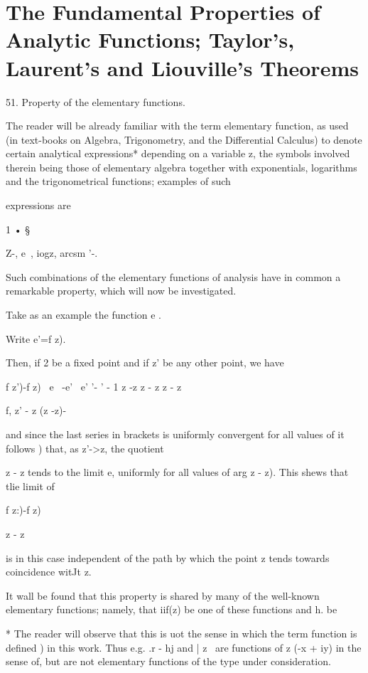 \chapter{The Fundamental Properties of Analytic Functions; 
Taylor's, Laurent's and Liouville's Theorems} 

51. Property of the elementary functions.

The reader will be already familiar with the term elementary function,
as used (in text-books on Algebra, Trigonometry, and the Differential
Calculus) to denote certain analytical expressions* depending on a
variable z, the symbols involved therein being those of elementary
algebra together with exponentials, logarithms and the trigonometrical
functions; examples of such

expressions are

1 • §

Z-, e~, iogz, arcsm '-.

Such combinations of the elementary functions of analysis have in
common a remarkable property, which will now be investigated.

Take as an example the function e .

Write e'=f z).

Then, if 2 be a fixed point and if z' be any other point, we have

f z')-f z) \ e~ -e' \, e' '- ' - 1 z -z z - z z - z

f, z' - z (z -z)-

and since the last series in brackets is uniformly convergent for all
values of it follows ) that, as z'->z, the quotient

z - z tends to the limit e, uniformly for all values of arg z - z).
This shews that tlie limit of

f z:)-f z)

z - z

is in this case independent of the path by which the point z tends
towards coincidence witJt z.

It wall be found that this property is shared by many of the
well-known elementary functions; namely, that iif(z) be one of these
functions and h. be

* The reader will observe that this is uot the sense in which the term
function is defined ) in this work. Thus e.g. .r - hj and | z \
are functions of z (-x + iy) in the sense of, but are not
elementary functions of the type under consideration.

